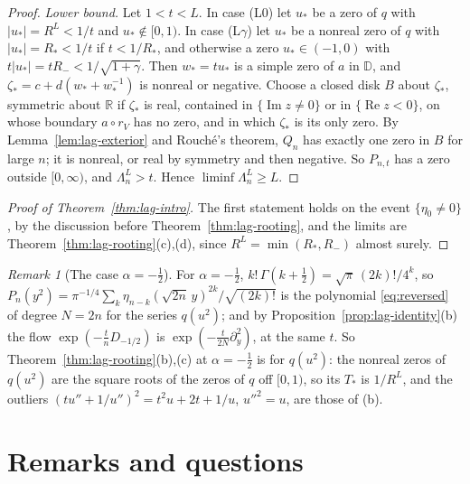 \documentclass[11pt]{amsart}
\theoremstyle{definition}
\theoremstyle{remark}
\newtheorem{remark}[theorem]{Remark}
\numberwithin{equation}{section}
\newcommand{\R}{\mathbb{R}}
\newcommand{\D}{\mathbb{D}}
\DeclareMathOperator{\re}{Re}
\DeclareMathOperator{\im}{Im}
\begin{document}
\begin{proof}
\emph{Lower bound.} Let $1<t<L$. In case (L0) let $u_*$ be a zero of $q$ with $|u_*|=R^L<1/t$ and $u_*\notin[0,1)$. In case (L$\gamma$) let $u_*$ be a nonreal zero of $q$ with $|u_*|=R_*<1/t$ if $t<1/R_*$, and otherwise a zero $u_*\in(-1,0)$ with $t|u_*|=tR_-<1/\sqrt{1+\gamma}$. Then $w_*=tu_*$ is a simple zero of $a$ in $\D$, and $\zeta_*=c+d(w_*+w_*^{-1})$ is nonreal or negative. Choose a closed disk $B$ about $\zeta_*$, symmetric about $\R$ if $\zeta_*$ is real, contained in $\{\im z\ne0\}$ or in $\{\re z<0\}$, on whose boundary $a\circ r_V$ has no zero, and in which $\zeta_*$ is its only zero. By Lemma~\ref{lem:lag-exterior} and Rouch\'e's theorem, $Q_n$ has exactly one zero in $B$ for large $n$; it is nonreal, or real by symmetry and then negative. So $P_{n,t}$ has a zero outside $[0,\infty)$, and $\Lambda^L_n>t$. Hence $\liminf\Lambda^L_n\ge L$.
\end{proof}

\begin{proof}[Proof of Theorem~\ref{thm:lag-intro}]
The first statement holds on the event $\{\eta_0\ne0\}$, by the discussion before Theorem~\ref{thm:lag-rooting}, and the limits are Theorem~\ref{thm:lag-rooting}(c),(d), since $R^L=\min(R_*,R_-)$ almost surely.
\end{proof}

\begin{remark}[The case $\alpha=-\frac12$]\label{rem:lag-half}
For $\alpha=-\frac12$, $k!\,\Gamma(k+\frac12)=\sqrt\pi\,(2k)!/4^k$, so $P_n(y^2)=\pi^{-1/4}\sum_k\eta_{n-k}(\sqrt{2n}\,y)^{2k}/\sqrt{(2k)!}$ is the polynomial \eqref{eq:reversed} of degree $N=2n$ for the series $q(u^2)$; and by Proposition~\ref{prop:lag-identity}(b) the flow $\exp(-\frac tnD_{-1/2})$ is $\exp(-\frac t{2N}\partial_y^2)$, at the same $t$. So Theorem~\ref{thm:lag-rooting}(b),(c) at $\alpha=-\frac12$ is \cite[Theorem~\ref{M-thm:fixedq}]{Main} for $q(u^2)$: the nonreal zeros of $q(u^2)$ are the square roots of the zeros of $q$ off $[0,1)$, so its $T_*$ is $1/R^L$, and the outliers $(tu''+1/u'')^2=t^2u+2t+1/u$, $u''^2=u$, are those of (b).
\end{remark}

\section{Remarks and questions}\label{sec:remarks}
\end{document}
